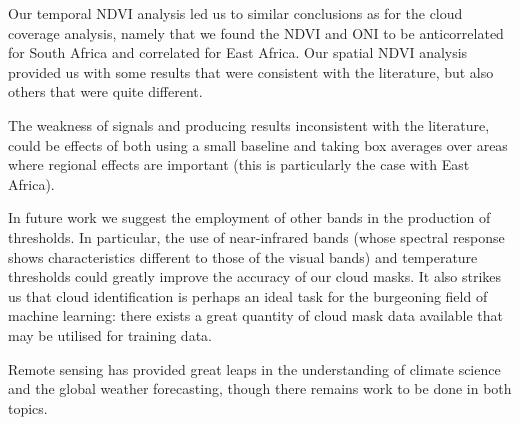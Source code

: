 Our temporal NDVI analysis led us to similar conclusions as for the
cloud coverage analysis, namely that we found the NDVI and ONI to be
anticorrelated for South Africa and correlated for East Africa. Our
spatial NDVI analysis provided us with some results that were
consistent with the literature, but also others that were quite
different.

The weakness of signals and producing results inconsistent with the
literature, could be effects of both using a small baseline and taking
box averages over areas where regional effects are important (this is
particularly the case with East Africa).

In future work we suggest the employment of other bands in the
production of thresholds. In particular, the use of near-infrared
bands (whose spectral response shows characteristics different to
those of the visual bands) and temperature thresholds could greatly
improve the accuracy of our cloud masks. It also strikes us that cloud
identification is perhaps an ideal task for the burgeoning field of
machine learning: there exists a great quantity of cloud mask data
available that may be utilised for training data. 

Remote sensing has provided great leaps in the understanding of
climate science and the global weather forecasting, though there
remains work to be done in both topics.

